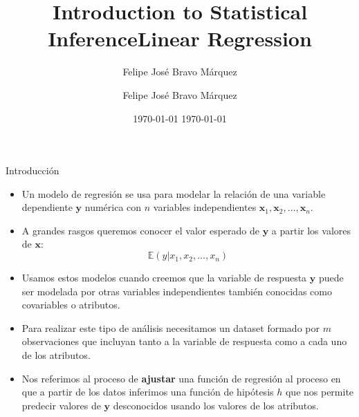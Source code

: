 \documentclass[handout]{beamer}
\title{Introduction to Statistical Inference}
\author[Felipe Bravo Márquez]{\footnotesize
 \textcolor[rgb]{0.00,0.00,1.00}{Felipe José Bravo Márquez}}
\date{ \today }
\title{Linear Regression}
\author[Felipe Bravo Márquez]{\footnotesize
 \textcolor[rgb]{0.00,0.00,1.00}{Felipe José Bravo Márquez}}
\date{ \today }
\begin{document}
\begin{frame}
\titlepage


\end{frame}





\begin{frame}{Introducción}
\scriptsize{
\begin{itemize}

 \item Un modelo de regresión se usa para modelar la relación de una variable dependiente $\mathbf{y}$ numérica con $n$ variables independientes $\mathbf{x}_1, \mathbf{x}_2, \dots, \mathbf{x}_n$. 
 
 \item A grandes rasgos queremos conocer el valor esperado de $\mathbf{y}$ a partir los valores de $\mathbf{x}$:
 \begin{displaymath}
 \mathbb{E}(y|x_1,x_2,\dots,x_n)
 \end{displaymath}

 
 \item Usamos estos modelos cuando creemos que la variable de respuesta $\mathbf{y}$ puede ser modelada por otras variables independientes también conocidas como covariables o atributos.
 
 \item Para realizar este tipo de análisis necesitamos un dataset formado por $m$ observaciones que incluyan tanto a la variable de respuesta como a cada uno de los atributos.
 
 \item Nos referimos al proceso de \textbf{ajustar} una función de regresión al proceso en que a partir de los datos inferimos una función de hipótesis $h$ que nos permite predecir valores de $\mathbf{y}$ desconocidos usando los valores de los atributos.

 
\end{itemize}



} 
 
\end{frame}
\end{document}
